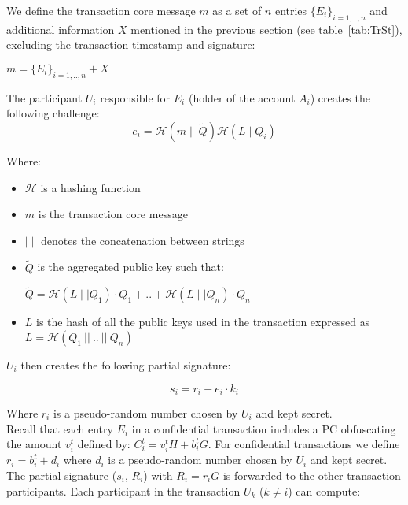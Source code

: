 We define the transaction core message $m$ as a set of $n$ entries $\{E_i\}_{i=1,..,n}$ and additional information $X$ mentioned in the previous section (see table~\ref{tab:TrSt}), excluding the transaction timestamp and signature:
\begin{center}
$m = \{E_i\}_{i=1,..,n} + X$ 
\end{center}

The participant $U_i$ responsible for $E_i$ (holder of the account $A_i$) creates the following challenge:
\begin{equation} 
e_i = \mathcal{H}(m \mid\mid \tilde{Q})\mathcal{H}(L \mid Q_i)
\end{equation} 

Where:

\begin{itemize}
	\item$\mathcal{H}$ is a hashing function
	\item$m$ is the transaction core message 
	\item$\mid\mid$ denotes the concatenation between strings
	\item$\tilde{Q}$ is the aggregated public key such that:
\begin{center}
$\tilde{Q}=\mathcal{H}(L \mid\mid Q_1)\cdot Q_1 + .. + \mathcal{H}(L \mid\mid Q_n)\cdot Q_n$
\end{center}
	\item$L$ is the hash of all the public keys used in the transaction expressed as $L=\mathcal{H}(Q_1~||~..~||~Q_n)$
\end{itemize}

$U_i$ then creates the following partial signature:

\begin{equation} 
s_{i} = r_i + e_i\cdot k_i
\end{equation}

Where $r_i$ is a pseudo-random number chosen by $U_i$ and kept secret.\\

 Recall that each entry $E_i$ in a confidential transaction includes a PC obfuscating the amount $v_i^{t}$ defined by: $C_i^{t} = v_i ^{t} H + b_i^{t} G$. For confidential transactions we define $r_i = b_i^t + d_i$ where $d_i$ is a pseudo-random number chosen by $U_i$ and kept secret.\\

The partial signature ($s_i$, $R_i$) with $R_i = r_iG$ is forwarded to the other transaction participants. Each participant in the transaction $U_k$ ($k\neq i$) can compute:

